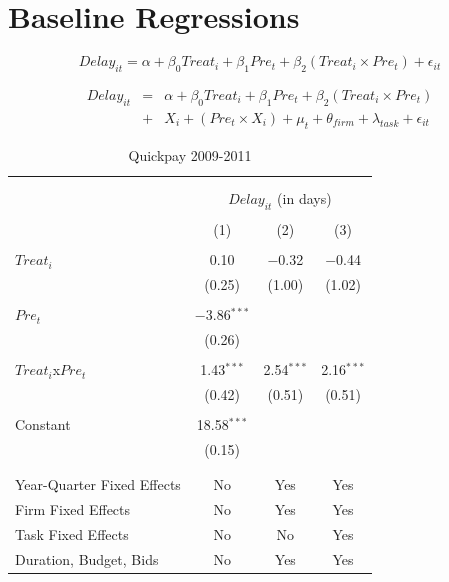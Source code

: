 \documentclass[
]{article}
\begin{document}
\hypertarget{baseline-regressions}{%
\section{Baseline Regressions}\label{baseline-regressions}}

\[ Delay_{it} = \alpha+\beta_0 Treat_i + \beta_1 Pre_t + \beta_2 (Treat_i \times Pre_t) + \epsilon_{it}\]

\[ \begin{aligned} Delay_{it} &=& \alpha+\beta_0 Treat_i + \beta_1 Pre_t + \beta_2 (Treat_i \times Pre_t)\\
&+&  X_i + (Pre_t \times X_i) + \mu_t + \theta_{firm} + \lambda_{task}+ \epsilon_{it}
\end{aligned}\]

\begin{table}[H] \centering 
  \caption{Quickpay 2009-2011} 
  \label{} 
\small 
\begin{tabular}{@{\extracolsep{-2pt}}lccc} 
\\[-1.8ex]\hline 
\hline \\[-1.8ex] 
\\[-1.8ex] & \multicolumn{3}{c}{$Delay_{it}$ (in days)} \\ 
\\[-1.8ex] & (1) & (2) & (3)\\ 
\hline \\[-1.8ex] 
 $Treat_i$ & 0.10 & $-$0.32 & $-$0.44 \\ 
  & (0.25) & (1.00) & (1.02) \\ 
  & & & \\ 
 $Pre_t$ & $-$3.86$^{***}$ &  &  \\ 
  & (0.26) &  &  \\ 
  & & & \\ 
 $Treat_i$x$Pre_t$ & 1.43$^{***}$ & 2.54$^{***}$ & 2.16$^{***}$ \\ 
  & (0.42) & (0.51) & (0.51) \\ 
  & & & \\ 
 Constant & 18.58$^{***}$ &  &  \\ 
  & (0.15) &  &  \\ 
  & & & \\ 
\hline \\[-1.8ex] 
Year-Quarter Fixed Effects & No & Yes & Yes \\ 
Firm Fixed Effects & No & Yes & Yes \\ 
Task Fixed Effects & No & No & Yes \\ 
Duration, Budget, Bids & No & Yes & Yes \\ 

\end{tabular}
\end{table}
\end{document}
